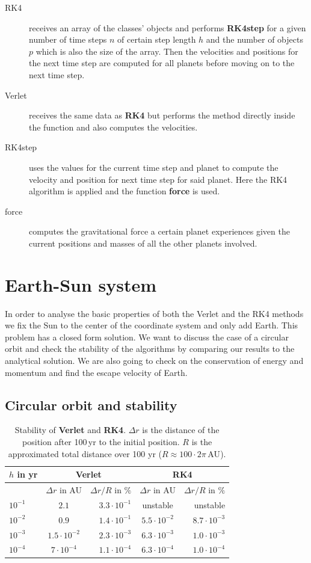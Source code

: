 \documentclass[11pt,a4wide]{article}
\begin{document}
	\begin{description}
	\item[RK4] receives an array of the classes' objects and performs \textbf{RK4step} for a given number of time steps $n$ of certain step length $h$ and the number of objects $p$ which is also the size of the array. Then the velocities and positions for the next time step are computed for all planets before moving on to the next time step.
	\item[Verlet] receives the same data as \textbf{RK4} but performs the method directly inside the function and also computes the velocities.
	\item[RK4step] uses the values for the current time step and planet to compute the velocity and position for next time step for said planet. Here the RK4 algorithm is applied and the function \textbf{force} is used.
	\item[force] computes the gravitational force a certain planet experiences given the current positions and masses of all the other planets involved. 
	\end{description}
	\section{Earth-Sun system}
	In order to analyse the basic properties of both the Verlet and the RK4 methods we fix the Sun to the center of the coordinate system and only add Earth. This problem has a closed form solution. We want to discuss the case of a circular orbit and check the stability of the algorithms by comparing our results to the analytical solution. We are also going to check on the conservation of energy and momentum and find the escape velocity of Earth.
	\subsection{Circular orbit and stability}
	\begin{table}
	\centering%
	\caption{Stability of \textbf{Verlet} and \textbf{RK4}. $\Delta r$ is the distance of the position after 100\,yr to the initial position. $R$ is the approximated total distance over 100 yr ($R\approx 100\cdot 2\pi \,\text{AU}$).}
	\begin{tabular}{l|cr|cr}\hline
	$h$ in yr & \multicolumn{2}{c|}{ \textbf{Verlet} } & \multicolumn{2}{c}{\textbf{RK4}}\\\hline
	& $\Delta r$ in AU & $\Delta r/R$ in $\%$ & $\Delta r$ in AU & $\Delta r/R$ in $\%$ \\\hline
	$10^{-1}$ & $2.1$											& $3.3\cdot10^{-1}$ &  unstable     						& unstable                \\
	$10^{-2}$ & $0.9$											& $1.4\cdot10^{-1}$ &	 $5.5\cdot10^{-2}$ & $8.7\cdot10^{-3}$ \\
	$10^{-3}$ & $1.5\cdot10^{-2}$	& $2.3\cdot10^{-3}$ &  $6.3\cdot10^{-3}$ & $1.0\cdot10^{-3}$ \\
	$10^{-4}$ & $7\cdot10^{-4}$		& $1.1\cdot10^{-4}$ &  $6.3\cdot10^{-4}$ & $1.0\cdot10^{-4}$ 
	\end{tabular}
	\label{tab:stab}
	\end{table}
	
\end{document}
